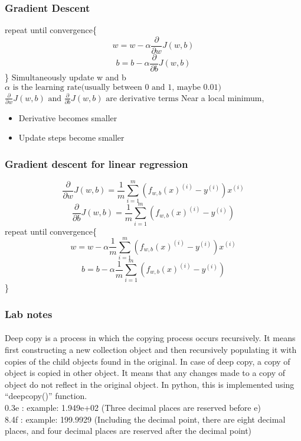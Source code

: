 \documentclass{article}
\begin{document}
    \subsubsection{Gradient Descent}
    repeat until convergence\{
    \[ w=w-\alpha\frac{\partial}{\partial w}J(w,b) \]
    \[ b=b-\alpha\frac{\partial}{\partial b}J(w,b) \]
    \} \newline
    Simultaneously update w and b \newline
    $\alpha\text{ is the learning rate(usually between 0 and 1, maybe 0.01)}$ \newline
    $\frac{\partial}{\partial w}J(w,b)\text{ and }\frac{\partial}{\partial b}J(w,b)\text{ are derivative terms}$ \newline
    Near a local minimum,
    \begin{itemize}
        \item Derivative becomes smaller
        \item Update steps become smaller
    \end{itemize}
    \subsubsection{Gradient descent for linear regression}
    \[\frac{\partial}{\partial w}J(w,b) = \frac{1}{m}\sum_{i=1}^{m}(f_{w,b}(x)^{(i)}-y^{(i)})x^{(i)}\]
    \[\frac{\partial}{\partial b}J(w,b) = \frac{1}{m}\sum_{i=1}^{m}(f_{w,b}(x)^{(i)}-y^{(i)})\]
    repeat until convergence\{
    \[w = w - \alpha\frac{1}{m}\sum_{i=1}^{m}(f_{w,b}(x)^{(i)}-y^{(i)})x^{(i)}\]
    \[b = b - \alpha\frac{1}{m}\sum_{i=1}^{m}(f_{w,b}(x)^{(i)}-y^{(i)})\]
    \} 
    \subsubsection{Lab notes}
    \paragraph{}
    Deep copy is a process in which the copying process occurs recursively. It means first constructing a new collection object and then recursively populating it with copies of the child objects found in the original. In case of deep copy, a copy of object is copied in other object. It means that any changes made to a copy of object do not reflect in the original object. In python, this is implemented using “deepcopy()” function. \\
    0.3e : example: 1.949e+02 (Three decimal places are reserved before e) \\
    8.4f : example: 199.9929 (Including the decimal point, there are eight decimal places, and four decimal places are reserved after the decimal point) 
\end{document}
